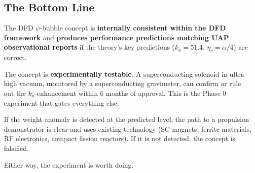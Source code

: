 \documentclass[12pt,aps,prd,superscriptaddress,nofootinbib,longbibliography]{revtex4-2}
\newcommand{\ka}{k_a}
\newcommand{\etac}{\eta_c}
\begin{document}
\subsection{The Bottom Line}

The DFD $\psi$-bubble concept is \textbf{internally consistent within
the DFD framework} and \textbf{produces performance predictions matching
UAP observational reports} if the theory's key predictions ($\ka = 51.4$,
$\etac = \alpha/4$) are correct.

The concept is \textbf{experimentally testable}.  A superconducting
solenoid in ultra-high vacuum, monitored by a superconducting gravimeter,
can confirm or rule out the $\ka$-enhancement within 6 months of
approval.  This is the Phase 0 experiment that gates everything else.

If the weight anomaly is detected at the predicted level, the path
to a propulsion demonstrator is clear and uses existing technology
(SC magnets, ferrite materials, RF electronics, compact fission
reactors).  If it is not detected, the concept is falsified.

Either way, the experiment is worth doing.
\end{document}
